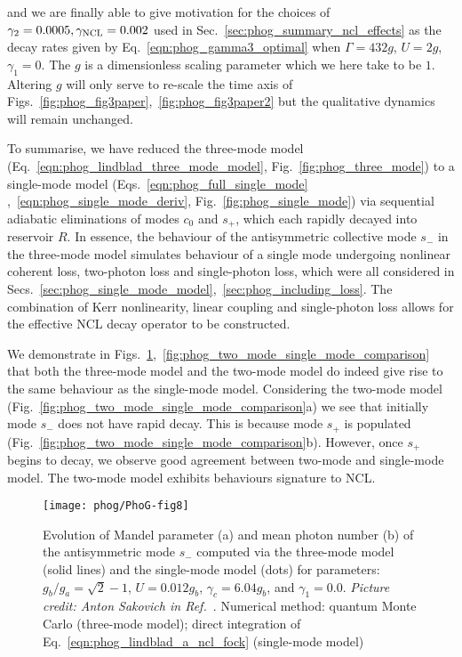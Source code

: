 \noindent and we are finally able to give motivation for the choices of $\gamma_2=0.0005, \gamma_{\text{NCL}}=0.002$ used in Sec.~\ref{sec:phog_summary_ncl_effects} as the decay rates given by Eq.~\ref{eqn:phog_gamma3_optimal} when $\Gamma = 432 g$, $U = 2 g$, $\gamma_1 = 0$. The $g$ is a dimensionless scaling parameter which we here take to be $1$. Altering $g$ will only serve to re-scale the time axis of Figs.~\ref{fig:phog_fig3paper},~\ref{fig:phog_fig3paper2} but the qualitative dynamics will remain unchanged. 

To summarise, we have reduced the three-mode model (Eq.~\ref{eqn:phog_lindblad_three_mode_model}, Fig.~\ref{fig:phog_three_mode}) to a single-mode model (Eqs.~\ref{eqn:phog_full_single_mode}
,~\ref{eqn:phog_single_mode_deriv}, Fig.~\ref{fig:phog_single_mode}) via sequential adiabatic eliminations of modes $c_0$ and $s_+$, which each rapidly decayed into reservoir $R$. In essence, the behaviour of the antisymmetric collective mode $s_-$ in the three-mode model simulates behaviour of a single mode undergoing nonlinear coherent loss, two-photon loss and single-photon loss, which were all considered in Secs.~\ref{sec:phog_single_mode_model},~\ref{sec:phog_including_loss}. The combination of Kerr nonlinearity, linear coupling and single-photon loss allows for the effective NCL decay operator to be constructed.

We demonstrate in Figs.~\ref{fig:phog_three_mode_single_mode_comparison},~\ref{fig:phog_two_mode_single_mode_comparison} that both the three-mode model and the two-mode model do  indeed give rise to the same behaviour as the single-mode model. Considering the two-mode model (Fig.~\ref{fig:phog_two_mode_single_mode_comparison}a) we see that initially mode $s_-$ does not have rapid decay. This is because mode $s_+$ is populated (Fig.~\ref{fig:phog_two_mode_single_mode_comparison}b). However, once $s_+$ begins to decay, we observe good agreement between two-mode and single-mode model. The two-mode model exhibits behaviours signature to NCL.


\begin{figure}[htp]
\captionsetup{width=0.8\linewidth}
\centering
\texttt{[image: phog/PhoG-fig8]}
\caption{\label{fig:phog_three_mode_single_mode_comparison}
Evolution of Mandel parameter (a) and mean photon number (b) of the antisymmetric mode $s_-$ computed via the three-mode model (solid lines) and the single-mode model (dots) for parameters: $g_b / g_a = \sqrt{2} - 1$, $U = 0.012 g_b$, $\gamma_c = 6.04 g_b$, and $\gamma_1 = 0.0$. \emph{Picture credit: Anton Sakovich in Ref.~\cite{Thornton2019a}}. Numerical method: quantum Monte Carlo (three-mode model); direct integration of Eq.~\ref{eqn:phog_lindblad_a_ncl_fock} (single-mode model)}
\end{figure}

